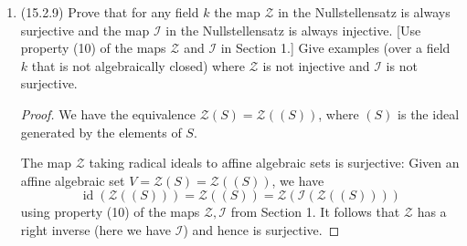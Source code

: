 \documentclass[11pt]{article}
\newcommand{\cbr}[1]{\left\{#1\right\}}
\DeclareMathOperator{\id}{id}
\begin{document}
\begin{enumerate}
\begin{proof}
    It follows that each $L_d$ is finitely generated, say as $(b_{d,1},\dots,b_{d,n_d})$ and let $f_{d,i}$ be a power series in $I$ with $\nu(f_{d,i}) = d$ and trailing coefficient $b_{d,i}$. We show that \[I = I^\prime\coloneqq (\cbr{f_1,\dots,f_n}\cup\cbr{f_{d,i}\mid 0\leq d\leq N-1,1\leq i\leq n_d}).\]

    The containment $I\supseteq I^\prime$ holds since every generator was in $I$ to begin with. Suppose that the reverse containment $I\subseteq I^\prime$ does not hold. Then there is a nonzero power series $f$ chosen maximally with respect to $\nu$ such that $f\not\in I^\prime$ (that is, if $\nu(g)>\nu(f)$ then $g\in I^\prime$). Let $\nu(f) = d$ and let $a$ be the trailing coefficient of $f$.

    Suppose first that $d\geq N$. Then $a\in L$ so that $a = r_1a_1+\cdots+r_na_n$ for some $r_i\in R$. Then $g = r_1x^{d-e_1}f_1 + \cdots + r_nx^{d-e_n}f_n$ is a power series in $I^\prime$ with $\nu(g) = d$ and the same trailing coefficient as $f$ so that $f-g\in I$ is a power series such that $\nu(f-g)>\nu(f)$ so that $f-g\in I^\prime$, and so $f\in I^\prime$, a contradiction.

    Suppose next that $d< N$ so that $a\in L_k$ for some $k<N$. Thus $a = r_1b_{k,1}+\cdots r_{n_k}b_{k,n_k}$ and so $g = r_1f_{k,1}+\cdots r_{n_k}f_{k,n_k}$ is a power series in $I^\prime$ with $\nu(g) = d$ and the same trailing coefficient as $f$ so that $f-g\in I$ is a power series that like in the previous case must be in $I^\prime$ so that $f\in I^\prime$, a contradiction. 

    It follows that $I = I^\prime$ so that $I$ is finitely generated. As $I$ was arbitrary, we must have that $R[[x]]$ is Noetherian.
    \end{proof}
    \item (15.2.9) Prove that for any field $k$ the map $\mathcal{Z}$ in the Nullstellensatz is always surjective and the map $\mathcal{I}$ in the Nullstellensatz is always injective. [Use property (10) of the maps $\mathcal{Z}$ and $\mathcal{I}$ in Section 1.] Give examples (over a field $k$ that is not algebraically closed) where $\mathcal{Z}$ is not injective and $\mathcal{I}$ is not surjective. \begin{proof}
    We have the equivalence $\mathcal{Z}(S) = \mathcal{Z}((S))$, where $(S)$ is the ideal generated by the elements of $S$. 

    The map $\mathcal{Z}$ taking radical ideals to affine algebraic sets is surjective: Given an affine algebraic set $V = \mathcal{Z}(S) = \mathcal{Z}((S))$, we have \[\id(\mathcal{Z}((S)))= \mathcal{Z}((S)) = \mathcal{Z}(\mathcal{I}(\mathcal{Z}((S))))\] using property (10) of the maps $\mathcal{Z},\mathcal{I}$ from Section 1. It follows that $\mathcal{Z}$ has a right inverse (here we have $\mathcal{I}$) and hence is surjective.
    

\end{proof}
\end{enumerate}
\end{document}
